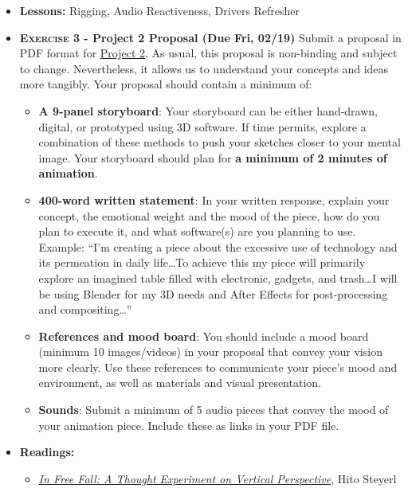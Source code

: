 \def\dMon{Mon, 02/15}
\def\dTues{Tues, 02/16}
\def\dWed{Wed, 02/17}
\def\dThur{Thur, 02/18}
\def\dFri{Fri, 02/19}
\def\dSat{Sat, 02/20}
\def\dSun{Sun, 02/21}
\placeDate

\begin{itemize}[noitemsep,topsep=0pt,leftmargin=*]
\item \textbf{Lessons:} Rigging, Audio Reactiveness, Drivers Refresher
\item \textbf{\textsc{Exercise 3} - Project 2 Proposal (Due \dFri)} Submit a proposal in PDF format for \hyperlink{project2}{Project 2}. As usual, this proposal is non-binding and subject to change. Nevertheless, it allows us to understand your concepts and ideas more tangibly. Your proposal should contain a minimum of:
          \begin{itemize}
              \item \textbf{A 9-panel storyboard}: Your storyboard can be either hand-drawn, digital, or prototyped using 3D software. If time permits, explore a combination of these methods to push your sketches closer to your mental image. Your storyboard should plan for \textbf{a minimum of 2 minutes of animation}.
              \item \textbf{400-word written statement}: In your written response, explain your concept, the emotional weight and the mood of the piece, how do you plan to execute it, and what software(s) are you planning to use. \newline
                    Example: ``I'm creating a piece about the excessive use of technology and its permeation in daily life\dots To achieve this my piece will primarily explore an imagined table filled with electronic, gadgets, and trash\dots I will be using Blender for my 3D needs and After Effects for post-processing and compositing\dots''
              \item \textbf{References and mood board}: You should include a mood board (minimum 10 images/videos) in your proposal that convey your vision more clearly. Use these references to communicate your piece's mood and environment, as well as materials and visual presentation.
              \item \textbf{Sounds}: Submit a minimum of 5 audio pieces that convey the mood of your animation piece. Include these as links in your PDF file.
          \end{itemize}
    \item \textbf{Readings:}
          \begin{itemize}
              \item \href{https://www.e-flux.com/journal/24/67860/in-free-fall-a-thought-experiment-on-vertical-perspective/}{\emph{In Free Fall: A Thought Experiment on Vertical Perspective}}, Hito Steyerl

\end{itemize}
\end{itemize}
